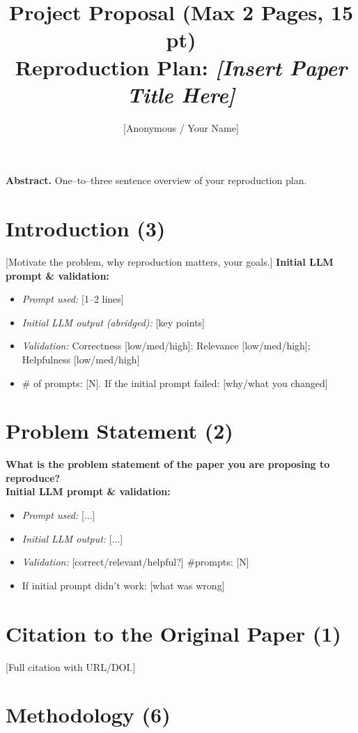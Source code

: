 \documentclass[15pt]{extarticle}
\title{\textbf{Project Proposal (Max 2 Pages, 15 pt)}\\
\large Reproduction Plan: \emph{[Insert Paper Title Here]}}
\author{[Anonymous / Your Name]}
\date{}
\begin{document}
\maketitle

\textbf{Abstract.} One–to–three sentence overview of your reproduction plan.

\section*{Introduction (3)}
[Motivate the problem, why reproduction matters, your goals.]
\textbf{Initial LLM prompt \& validation:}
\begin{itemize}
  \item \emph{Prompt used:} [1–2 lines]
  \item \emph{Initial LLM output (abridged):} [key points]
  \item \emph{Validation:} Correctness [low/med/high]; Relevance [low/med/high]; Helpfulness [low/med/high]
  \item \# of prompts: [N]. If the initial prompt failed: [why/what you changed]
\end{itemize}

\section*{Problem Statement (2)}
\textbf{What is the problem statement of the paper you are proposing to reproduce?}\\
[1–2 precise sentences.]
\textbf{Initial LLM prompt \& validation:}
\begin{itemize}
  \item \emph{Prompt used:} [...]
  \item \emph{Initial LLM output:} [...]
  \item \emph{Validation:} [correct/relevant/helpful?] \quad \#prompts: [N]
  \item If initial prompt didn’t work: [what was wrong]
\end{itemize}

\section*{Citation to the Original Paper (1)}
[Full citation with URL/DOI.]

\section*{Methodology (6)}
\end{document}
